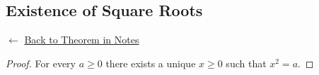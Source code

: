 
\subsection*{Existence of Square Roots}
\label{prf:existence-of-square-roots}

\begin{remark*}[Return]
$\leftarrow$ \hyperref[thm:existence-of-square-roots]{Back to Theorem in Notes}
\end{remark*}

\begin{proof}
\Claim For every $a \ge 0$ there exists a unique $x \ge 0$ such that $x^2 = a$.

\end{proof}

\begin{remark*}
\end{remark*}

\begin{remark*}[Dependencies]
\end{remark*}
